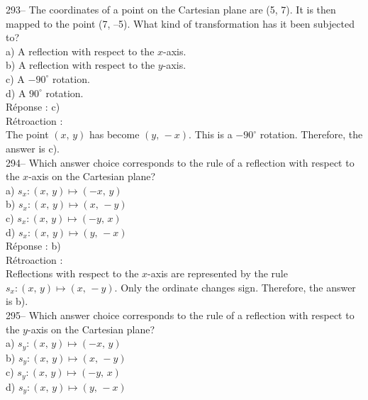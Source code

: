 \documentclass[letterpaper, 12pt]{article}
\begin{document}
293-- The coordinates of a point on the Cartesian plane are (5, 7).
It is then mapped to the point (7, --5). What kind of transformation
has it been subjected to?\\

a) A reflection with respect to the $x$-axis.\\
b) A reflection with respect to the $y$-axis.\\
c) A $-90^{\circ}$ rotation.\\
d) A $90^{\circ}$ rotation.\\

R\'eponse : c)\\

R\'etroaction : \\
The point $(x,\,y)$ has become $(y,\,-x)$. This is a
$-90^{\circ}$ rotation. Therefore, the answer is c).  \\

294-- Which answer choice corresponds to the rule of a reflection
with respect to the $x$-axis on the Cartesian plane?\\

a) $s_x :\left( x,\,y\right) \longmapsto \left(-x,\,y\right) $ \\
b) $s_x :\left( x,\,y\right) \longmapsto \left(x,\,-y\right) $ \\
c) $s_x :\left( x,\,y\right) \longmapsto \left(-y,\,x\right) $ \\
d) $s_x :\left( x,\,y\right) \longmapsto \left(y,\,-x\right) $ \\

R\'eponse : b)\\

R\'etroaction : \\
Reflections with respect to the $x$-axis are represented by the rule
$s_x :\left( x,\,y\right) \longmapsto \left(x,\,-y\right)$. Only the
ordinate changes sign. Therefore, the answer is b).\\

295-- Which answer choice corresponds to the rule of a reflection
with respect to the $y$-axis on the Cartesian plane?\\

a) $s_y :\left( x,\,y\right) \longmapsto \left(-x,\,y\right) $ \\
b) $s_y :\left( x,\,y\right) \longmapsto \left(x,\,-y\right) $ \\
c) $s_y :\left( x,\,y\right) \longmapsto \left(-y,\,x\right) $ \\
d) $s_y :\left( x,\,y\right) \longmapsto \left(y,\,-x\right) $ \\
\end{document}

